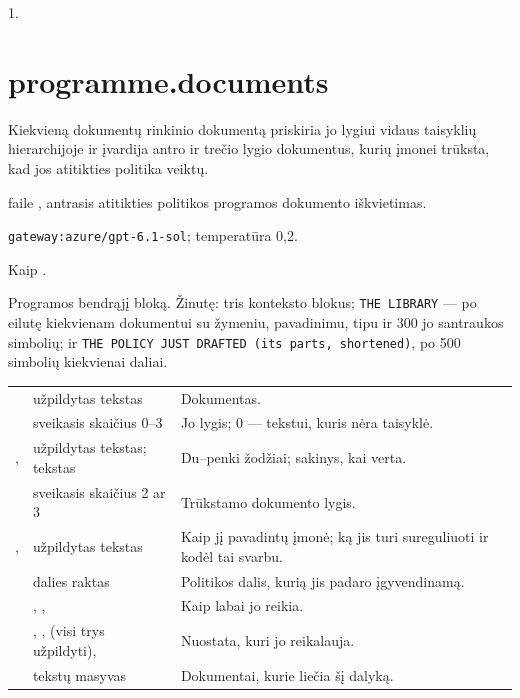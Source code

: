  1.


\section{programme.documents}\label{sec:aprompts:programme-documents}

 Kiekvieną dokumentų rinkinio dokumentą priskiria jo lygiui vidaus
taisyklių hierarchijoje ir įvardija antro ir trečio lygio dokumentus, kurių įmonei trūksta, kad
jos atitikties politika veiktų.

  faile , antrasis
atitikties politikos programos dokumento iškvietimas.

 \texttt{gateway:azure/gpt-6.1-sol}; temperatūra 0,2.

 Kaip .

 Programos bendrąjį bloką. Žinutę: tris
 konteksto blokus; \texttt{THE LIBRARY} --- po eilutę kiekvienam
dokumentui su žymeniu, pavadinimu, tipu ir 300 jo santraukos simbolių; ir \texttt{THE POLICY JUST DRAFTED (its parts, shortened)}, po 500 simbolių kiekvienai daliai.

\par\nopagebreak
\begin{xltabular}{\textwidth}{@{}L{40mm}L{30mm}Y@{}}
\toprule
{} &  &  \\
\midrule
\endhead
\bottomrule
\endlastfoot
{} & užpildytas tekstas & Dokumentas. \\
 & sveikasis skaičius 0--3 & Jo lygis; 0 --- tekstui, kuris nėra taisyklė. \\
,  & užpildytas tekstas; tekstas & Du--penki žodžiai; sakinys, kai verta. \\
 & sveikasis skaičius 2 ar 3 & Trūkstamo dokumento lygis. \\
,  & užpildytas tekstas & Kaip jį pavadintų įmonė; ką jis turi sureguliuoti ir kodėl tai svarbu. \\
 & dalies raktas & Politikos dalis, kurią jis padaro įgyvendinamą. \\
 & , ,  & Kaip labai jo reikia. \\
 & , ,  (visi trys užpildyti),  & Nuostata, kuri jo reikalauja. \\
 & tekstų masyvas & Dokumentai, kurie liečia šį dalyką. \\
\end{xltabular}

